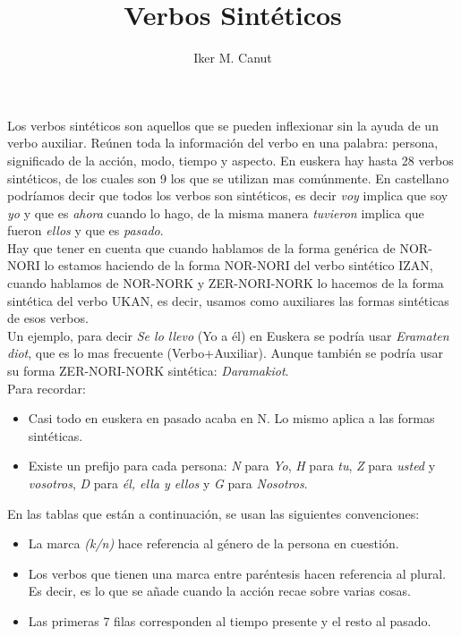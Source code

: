 \documentclass[11pt, a4paper]{article}
\begin{document}
\author{Iker M. Canut}
\pagestyle{myheadings}
\date{}
\title{Verbos Sintéticos\\}
\maketitle

Los verbos sintéticos son aquellos que se pueden inflexionar sin la ayuda de un verbo auxiliar. Reúnen toda la información del verbo en una palabra: persona, significado de la acción, modo, tiempo y aspecto. En euskera hay hasta 28 verbos sintéticos, de los cuales son 9 los que se utilizan mas comúnmente. En castellano podríamos decir que todos los verbos son sintéticos, es decir \textit{voy} implica que soy \textit{yo} y que es \textit{ahora} cuando lo hago, de la misma manera \textit{tuvieron} implica que fueron \textit{ellos} y que es \textit{pasado}.\\

Hay que tener en cuenta que cuando hablamos de la forma genérica de NOR-NORI lo estamos haciendo de la forma NOR-NORI del verbo sintético IZAN, cuando hablamos de NOR-NORK y ZER-NORI-NORK lo hacemos de la forma sintética del verbo UKAN, es decir, usamos como auxiliares las formas sintéticas de esos verbos.\\

Un ejemplo, para decir \textit{Se lo llevo} (Yo a él) en Euskera se podría usar \textit{Eramaten diot}, que es lo mas frecuente (Verbo+Auxiliar). Aunque también se podría usar su forma ZER-NORI-NORK sintética: \textit{Daramakiot}.\\

Para recordar:
\begin{itemize}
\item Casi todo en euskera en pasado acaba en N. Lo mismo aplica a las formas sintéticas.
\item Existe un prefijo para cada persona: \textit{N} para \textit{Yo}, \textit{H} para \textit{tu}, \textit{Z} para \textit{usted} y \textit{vosotros}, \textit{D} para \textit{él, ella y ellos} y \textit{G} para \textit{Nosotros}.\\
\end{itemize}

En las tablas que están a continuación, se usan las siguientes convenciones:
\begin{itemize}
	\item La marca \textit{(k/n)} hace referencia al género de la persona en cuestión.
	\item Los verbos que tienen una marca entre paréntesis hacen referencia al plural. Es decir, es lo que se añade cuando la acción recae sobre varias cosas.
	\item Las primeras 7 filas corresponden al tiempo presente y el resto al pasado.
\end{itemize}
\end{document}
